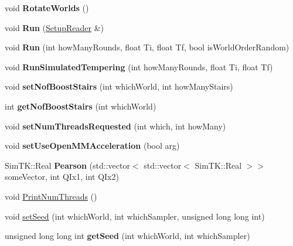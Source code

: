 \begin{DoxyCompactItemize}
\item 
void {\bfseries Rotate\+Worlds} ()\hypertarget{classContext_a4b30d57929b8019f0f80c4a5711f8766}{}\label{classContext_a4b30d57929b8019f0f80c4a5711f8766}

\item 
void {\bfseries Run} (\hyperlink{classSetupReader}{Setup\+Reader} \&)\hypertarget{classContext_a5aa7b7c23dba333d40f41b7951dbb175}{}\label{classContext_a5aa7b7c23dba333d40f41b7951dbb175}

\item 
void {\bfseries Run} (int how\+Many\+Rounds, float Ti, float Tf, bool is\+World\+Order\+Random)\hypertarget{classContext_a7348fe547472332d18426af129b9a3a4}{}\label{classContext_a7348fe547472332d18426af129b9a3a4}

\item 
void {\bfseries Run\+Simulated\+Tempering} (int how\+Many\+Rounds, float Ti, float Tf)\hypertarget{classContext_aeb6a4048885ad4003ac94474d0b30df1}{}\label{classContext_aeb6a4048885ad4003ac94474d0b30df1}

\item 
void {\bfseries set\+Nof\+Boost\+Stairs} (int which\+World, int how\+Many\+Stairs)\hypertarget{classContext_a3fd7bc68f83c99de8efde6959df55a19}{}\label{classContext_a3fd7bc68f83c99de8efde6959df55a19}

\item 
int {\bfseries get\+Nof\+Boost\+Stairs} (int which\+World)\hypertarget{classContext_a2284083b8826f90e1c8b2f0aea3c9fb9}{}\label{classContext_a2284083b8826f90e1c8b2f0aea3c9fb9}

\item 
void {\bfseries set\+Num\+Threads\+Requested} (int which, int how\+Many)\hypertarget{classContext_a5e8437125425ff102c70ca41699ce0b7}{}\label{classContext_a5e8437125425ff102c70ca41699ce0b7}

\item 
void {\bfseries set\+Use\+Open\+M\+M\+Acceleration} (bool arg)\hypertarget{classContext_a2ba22907d63230c2fa87a06c86dcd5ae}{}\label{classContext_a2ba22907d63230c2fa87a06c86dcd5ae}

\item 
Sim\+T\+K\+::\+Real {\bfseries Pearson} (std\+::vector$<$ std\+::vector$<$ Sim\+T\+K\+::\+Real $>$$>$ some\+Vector, int Q\+Ix1, int Q\+Ix2)\hypertarget{classContext_ab57d893cca89ec38c456c832c4f4066a}{}\label{classContext_ab57d893cca89ec38c456c832c4f4066a}

\item 
void \hyperlink{classContext_a5d537db9997bca9ccd5c900426b71ce4}{Print\+Num\+Threads} ()
\item 
void \hyperlink{classContext_ae8f8d3a9a48a56a0943f705958f30317}{set\+Seed} (int which\+World, int which\+Sampler, unsigned long long int)
\item 
unsigned long long int {\bfseries get\+Seed} (int which\+World, int which\+Sampler)\hypertarget{classContext_ac6822798cb05388843410d31f7267f9d}{}\label{classContext_ac6822798cb05388843410d31f7267f9d}


\end{DoxyCompactItemize}
